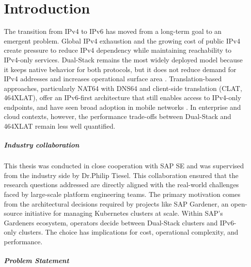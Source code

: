 \chapter{Introduction}
The transition from IPv4 to IPv6 has moved from a long-term goal to an emergent problem. Global IPv4 exhaustion and the growing cost of public IPv4 create pressure to reduce IPv4 dependency while maintaining reachability to IPv4-only services\cite{7737362,LEVIN20141059}. Dual-Stack remains the most widely deployed model because it keeps native behavior for both protocols, but it does not reduce demand for IPv4 addresses and increases operational surface area \cite{rfc4213}. Translation-based approaches, particularly NAT64 with DNS64 and client-side translation (CLAT, 464XLAT), offer an IPv6-first architecture that still enables access to IPv4-only endpoints, and have seen broad adoption in mobile networks \cite{rfc6146,rfc6147,rfc6877}. In enterprise and cloud contexts, however, the performance trade-offs between Dual-Stack and 464XLAT remain less well quantified.

\paragraph{Industry collaboration }
This thesis was conducted in close cooperation with SAP SE and was supervised from the industry side by Dr.Philip Tiesel. This collaboration ensured that the research questions addressed are directly aligned with the real-world challenges faced by large-scale platform engineering teams. The primary motivation comes from the architectural decisions required by projects like SAP Gardener, an open-source initiative for managing Kubernetes clusters at scale\cite{gardener_docs}. Within SAP’s Gardeners ecosystem, operators decide between Dual-Stack clusters and IPv6-only clusters. The choice has implications for cost, operational complexity, and performance. 

\paragraph{Problem Statement}

